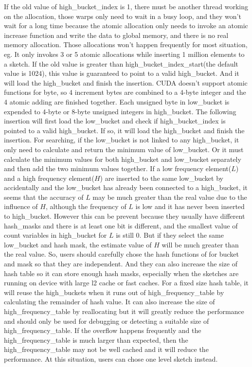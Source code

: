 \documentclass[conference]{IEEEtran}
\begin{document}
If the old value of high\_bucket\_index is 1, there must be another thread working on the allocation, those warps only need to wait in a busy loop, and they won't wait for a long time because the atomic allocation only needs to invoke an atomic increase function and write the data to global memory, and there is no real memory allocation. Those allocations won't happen frequently for most situation, eg. It only invokes 3 or 5 atomic allocations while inserting 1 million elements to a sketch.  %
If the old value is greater than high\_bucket\_index\_start(the default value is 1024), this value is guaranteed to point to a valid high\_bucket. And it will load the high\_bucket and finish the insertion. 
CUDA doesn't support atomic functions for byte, so 4 increment bytes are combined to a 4-byte integer and the 4 atomic adding are finished together. 
Each unsigned byte in low\_bucket is expended to 4-byte or 8-byte unsigned integers in high\_bucket.
The following insertion will first load the low\_bucket and check if high\_bucket\_index is pointed to a valid high\_bucket. If so, it will load the high\_bucket and finish the insertion. 
For searching, if the low\_bucket is not linked to any high\_bucket, it only need to calculate and return the minimum value of low\_bucket. Or it must calculate the minimum values for both high\_bucket and low\_bucket separately and then add the two minimum values together. If a low frequency element($L$) and a high frequency element($H$) are inserted to the same low\_bucket by accidentally and the low\_bucket has already been connected to a high\_bucket, it seems that the accuracy of $L$ may be much greater than the real value due to the influence of $H$, although the frequency of $L$ is low and it has never been inserted to high\_bucket. However this can be prevent because they usually have different hash\_masks and there is at least one bit is different, and the smallest value of count variables in high\_bucket for $L$ is still 0. But if they select the same low\_bucket and hash mask, the estimate value of $H$ will be much greater than the real value. So, users should carefully chose the hash functions of for bucket and mask so that they are independent. And they can also increase the size of hash table so it can store enough hash masks, especially when the sketches are running on device with large l2 cache or fast caches. For a fixed size hash table, it will reuse the high\_buckets when it runs out of high\_frequency\_table by calculating the remainder of hash value. It can also increase the size of high\_frequency\_table by reallocating but it will greatly reduce the performance and should only be used for debugging or detecting a suitable size of high\_frequency\_table. If the overflow happens frequently and the high\_frequency\_table is much larger than expected, then the high\_frequency\_table may not be well cached and it will reduce the performance. At this situation, users can chose one level sketch instead.
\end{document}
